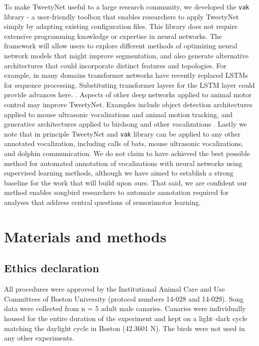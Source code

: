 \documentclass[10pt,letterpaper]{article}
\begin{document}
To make TweetyNet useful to a large research community, we developed the \texttt{vak} library - a user-friendly toolbox that enables 
researchers to apply TweetyNet simply by adapting existing configuration files. This library does not require extensive programming knowledge or expertise in neural networks. The framework will allow users to explore different methods of optimizing neural network models that might improve segmentation, and also generate alternative architectures that could incorporate distinct features and topologies. For example, in many domains transformer networks have recently replaced LSTMs for sequence processing. Substituting transformer layers for the LSTM layer could provide advances here. \cite{vaswani_attention_2017}.
Aspects of other deep networks applied to animal motor control may improve TweetyNet. Examples include object detection architectures \cite{coffey_deepsqueak_2019, mathis_deeplabcut_2018} 
applied to mouse ultrasonic vocalizations and animal motion tracking, 
and generative architectures applied to birdsong and other vocalizations 
\cite{goffinet_inferring_2019,sainburg2019animal,sainburg2019latent}. 
Lastly we note that in principle TweetyNet and \texttt{vak} library can be applied to any other annotated vocalization, including calls of bats, mouse ultrasonic vocalizations, and dolphin communication. 
We do not claim to have achieved the best possible method for automated annotation 
of vocalizations with neural networks using supervised learning methods, although 
we have aimed to establish a strong baseline for the work that will build upon ours.
That said, we are confident our method enables songbird researchers to automate annotation 
required for analyses that address central questions of sensorimotor learning.

\section*{Materials and methods}
\label{Methods}

\subsection*{Ethics declaration}
All procedures were approved by the Institutional Animal Care and Use Committees of Boston University (protocol numbers 14-028 and 14-029). Song data were collected from n = 5 adult male canaries. Canaries were individually housed for the entire duration of the experiment and kept on a light–dark cycle matching the daylight cycle in Boston (42.3601 N). The birds were not used in any other experiments.
\end{document}
